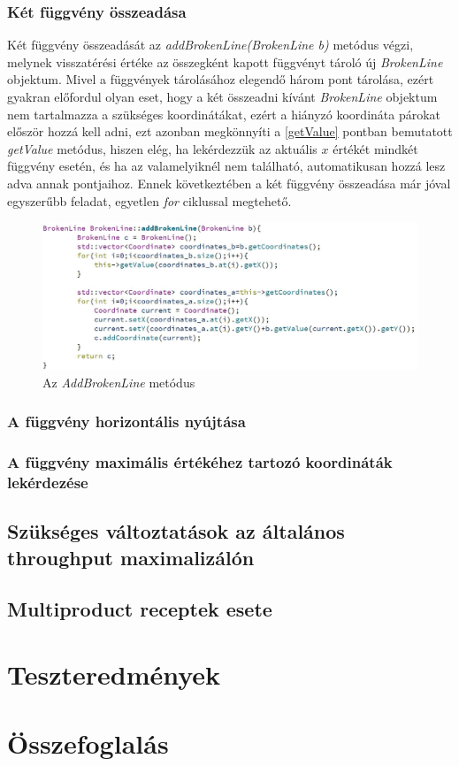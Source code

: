\documentclass [12pt]{report}
\begin{document}
\subsection{Két függvény összeadása} \label{addBrokenLine}
Két függvény összeadását az \textit{addBrokenLine(BrokenLine b)} metódus végzi, melynek visszatérési értéke az összegként kapott függvényt tároló új \textit{BrokenLine} objektum. Mivel a függvények tárolásához elegendő három pont tárolása, ezért gyakran előfordul olyan eset, hogy a két összeadni kívánt \textit{BrokenLine} objektum nem tartalmazza a szükséges koordinátákat, ezért a hiányzó koordináta párokat először hozzá kell adni, ezt azonban megkönnyíti a \ref{getValue} pontban bemutatott \textit{getValue} metódus, hiszen elég, ha lekérdezzük az aktuális $x$ értékét mindkét függvény esetén, és ha az valamelyiknél nem található, automatikusan hozzá lesz adva annak pontjaihoz. Ennek következtében a két függvény összeadása már jóval egyszerűbb feladat, egyetlen \textit{for} ciklussal megtehető.
\begin{figure}[H]
\begin{center}
\includegraphics[scale=0.48]{add_broken_line}
\caption{Az \textit{AddBrokenLine} metódus}
\label{add_broken_line}
\end{center}
\end{figure}
\subsection{A függvény horizontális nyújtása}
\subsection{A függvény maximális értékéhez tartozó koordináták lekérdezése}
\section{Szükséges változtatások az általános throughput maximalizálón} \label{refactor}
\section{Multiproduct receptek esete} \label{extended_multiproduct}
\chapter{Teszteredmények}
\chapter{Összefoglalás}



\end{document}

